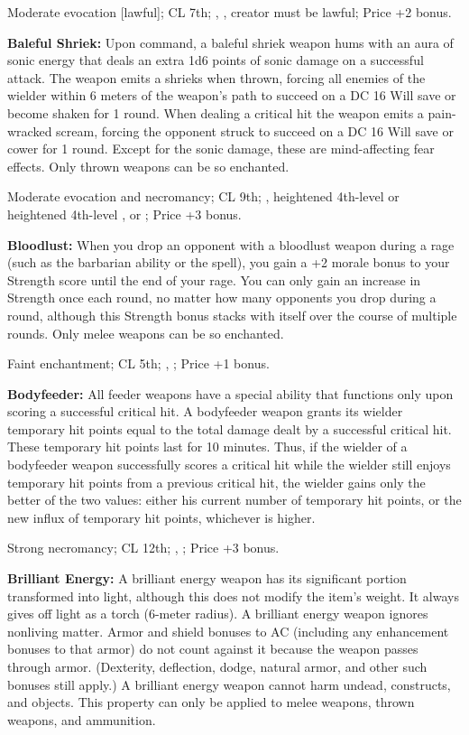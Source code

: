 Moderate evocation [lawful]; CL 7th; , , creator must be lawful; Price +2 bonus.


\textbf{Baleful Shriek:} Upon command, a baleful shriek weapon hums with an aura of sonic energy that deals an extra 1d6 points of sonic damage on a successful attack. The weapon emits a shrieks when thrown, forcing all enemies of the wielder within 6 meters of the weapon's path to succeed on a DC 16 Will save or become shaken for 1 round. When dealing a critical hit the weapon emits a pain-wracked scream, forcing the opponent struck to succeed on a DC 16 Will save or cower for 1 round. Except for the sonic damage, these are mind-affecting fear effects. Only thrown weapons can be so enchanted.

Moderate evocation and necromancy; CL 9th; , heightened 4th-level  or heightened 4th-level ,  or ; Price +3 bonus.


\textbf{Bloodlust:} When you drop an opponent with a bloodlust weapon during a rage (such as the barbarian ability or the spell), you gain a +2 morale bonus to your Strength score until the end of your rage. You can only gain an increase in Strength once each round, no matter how many opponents you drop during a round, although this Strength bonus stacks with itself over the course of multiple rounds. Only melee weapons can be so enchanted.

Faint enchantment; CL 5th; , ; Price +1 bonus.


\textbf{Bodyfeeder:} All feeder weapons have a special ability that functions only upon scoring a successful critical hit. A bodyfeeder weapon grants its wielder temporary hit points equal to the total damage dealt by a successful critical hit. These temporary hit points last for 10 minutes. Thus, if the wielder of a bodyfeeder weapon successfully scores a critical hit while the wielder still enjoys temporary hit points from a previous critical hit, the wielder gains only the better of the two values: either his current number of temporary hit points, or the new influx of temporary hit points, whichever is higher.

Strong necromancy; CL 12th; , ; Price +3 bonus.


\textbf{Brilliant Energy:} A brilliant energy weapon has its significant portion transformed into light, although this does not modify the item's weight. It always gives off light as a torch (6-meter radius). A brilliant energy weapon ignores nonliving matter. Armor and shield bonuses to AC (including any enhancement bonuses to that armor) do not count against it because the weapon passes through armor. (Dexterity, deflection, dodge, natural armor, and other such bonuses still apply.) A brilliant energy weapon cannot harm undead, constructs, and objects. This property can only be applied to melee weapons, thrown weapons, and ammunition.

